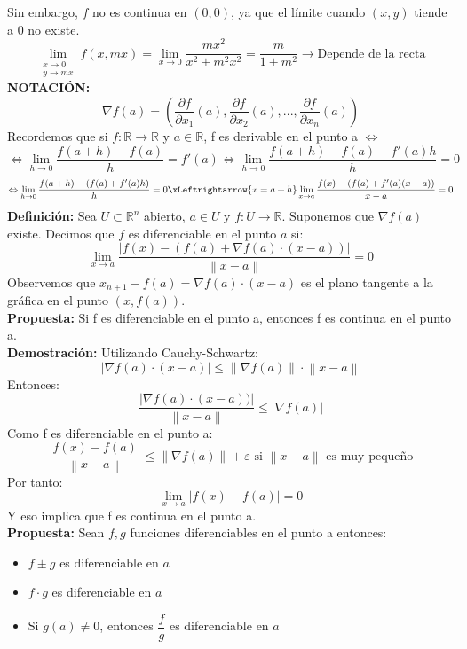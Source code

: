 \documentclass[11pt]{article}
\providecommand{\norm}[1]{\left\lVert #1 \right \rVert}
\providecommand{\abs}[1]{\left\lvert #1\right\rvert}
\providecommand{\norm}[1]{\left\lVert #1 \right \rVert}
\providecommand{\abs}[1]{\left\lvert #1\right\rvert}
\newcommand{\R}{\mathbb{R}}
\theoremstyle{plain}
\begin{document}
            Sin embargo, $f$ no es continua en $(0,0)$, ya que el límite cuando $(x,y)$ tiende a 0 no existe.
            \[\lim_{\substack{x \to 0 \\ y \to mx}} f(x,mx) = \lim_{x \to 0} \frac{mx^2}{x^2 + m^2x^2} = \frac{m}{1 + m^2} \rightarrow \text{Depende de la recta}\]
        \textbf{NOTACIÓN:}
        \begin{equation}
            \nabla f(a) = \left( \frac{\partial f}{\partial x_1}(a), \frac{\partial f}{\partial x_2}(a), ... , \frac{\partial f}{\partial x_n}(a)\right) 
        \end{equation}
        Recordemos que si $f:\R \rightarrow \R$ y $a\in \R$, f es derivable en el punto a $\Leftrightarrow$
        \[\Leftrightarrow \lim_{h \to 0} \frac{f(a+h) - f(a)}{h} = f'(a) \Leftrightarrow \lim_{h \to 0} \frac{f(a+h) - f(a) - f'(a)h}{h} = 0\]
        \[\Leftrightarrow \lim_{h\to 0} \frac{f(a+h) - (f(a)+f'(a)h)}{h} = 0 \xLeftrightarrow{x=a+h} \lim_{x\to a} \frac{f(x) - (f(a)+ f'(a)(x-a))}{x-a} = 0\]
        \textbf{Definición:} Sea $U \subset \R^n$ abierto, $a \in U$ y $f:U\rightarrow \R$. Suponemos que $\nabla f(a)$ existe. Decimos que $f$ es diferenciable en el punto $a$ si:
        \begin{equation}
            \lim_{x \to a} \frac{\abs{f(x) - (f(a) + \nabla f(a)\cdot (x-a))}}{\norm{x-a}} = 0
        \end{equation}
        Observemos que $x_{n+1} - f(a) = \nabla f(a)\cdot(x-a)$ es el plano tangente a la gráfica en el punto $(x,f(a))$.\\
        \textbf{Propuesta:} Si f es diferenciable en el punto a, entonces f es continua en el punto a.\\
        \textbf{Demostración:}
            Utilizando Cauchy-Schwartz:
            \[\abs{\nabla f(a) \cdot (x-a)} \le \norm{\nabla f(a)} \cdot \norm{x-a}\]
            Entonces:
            \[\frac{\abs{\nabla f(a)\cdot (x-a))}}{\norm{x-a}} \le \abs{\nabla f(a)}\]
            Como f es diferenciable en el punto a:
            \[\frac{\abs{f(x)-f(a)}}{\norm{x-a}} \le \norm{\nabla f(a)} + \varepsilon \text{ si } \norm{x-a} \text{ es muy pequeño}\]
            Por tanto:
            \[\lim_{x \to a} \abs{f(x)-f(a)} = 0\]
            Y eso implica que f es continua en el punto a.\\
        \textbf{Propuesta:} Sean $f,g$ funciones diferenciables en el punto a entonces:
        \begin{itemize}
            \item $f\pm g$ es diferenciable en $a$
            \item $f \cdot g$ es diferenciable en $a$
            \item Si $g(a)\ne 0$, entonces $\dfrac{f}{g}$ es diferenciable en $a$ 
        \end{itemize}
\end{document}

